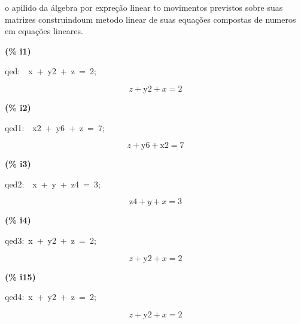 \documentclass[fleqn]{article}
\begin{document}
o apilido da álgebra por expreção linear to movimentos previstos sobre suas matrizes construindoum metodo linear de suas equações compostas de numeros em equações lineares.


\noindent
\begin{minipage}[t]{4.000000em}\color{red}\bfseries
(\% i1)	
\end{minipage}
\begin{minipage}[t]{\textwidth}\color{blue}
qed:\ \ x\ +\ y2\ +\ z\ =\ 2;\ 
\end{minipage}
\[\displaystyle \tag{qed} 
z\mathop{+}\ensuremath{\mathrm{y2}}\mathop{+}x\mathop{=}2\mbox{}
\]


\noindent
\begin{minipage}[t]{4.000000em}\color{red}\bfseries
(\% i2)	
\end{minipage}
\begin{minipage}[t]{\textwidth}\color{blue}
qed1:\ \ x2\ +\ y6\ +\ z\ =\ 7;
\end{minipage}
\[\displaystyle \tag{qed1} 
z\mathop{+}\ensuremath{\mathrm{y6}}\mathop{+}\ensuremath{\mathrm{x2}}\mathop{=}7\mbox{}
\]


\noindent
\begin{minipage}[t]{4.000000em}\color{red}\bfseries
(\% i3)	
\end{minipage}
\begin{minipage}[t]{\textwidth}\color{blue}
qed2:\ \ x\ +\ y\ +\ z4\ =\ 3;
\end{minipage}
\[\displaystyle \tag{qed2} 
\ensuremath{\mathrm{z4}}\mathop{+}y\mathop{+}x\mathop{=}3\mbox{}
\]


\noindent
\begin{minipage}[t]{4.000000em}\color{red}\bfseries
(\% i4)	
\end{minipage}
\begin{minipage}[t]{\textwidth}\color{blue}
qed3:\ x\ +\ y2\ +\ z\ =\ 2;
\end{minipage}
\[\displaystyle \tag{qed3} 
z\mathop{+}\ensuremath{\mathrm{y2}}\mathop{+}x\mathop{=}2\mbox{}
\]


\noindent
\begin{minipage}[t]{4.000000em}\color{red}\bfseries
(\% i15)	
\end{minipage}
\begin{minipage}[t]{\textwidth}\color{blue}
qed4:\ x\ +\ y2\ +\ z\ =\ 2;
\end{minipage}
\[\displaystyle \tag{qed4} 
z\mathop{+}\ensuremath{\mathrm{y2}}\mathop{+}x\mathop{=}2\mbox{}
\]
\end{document}
